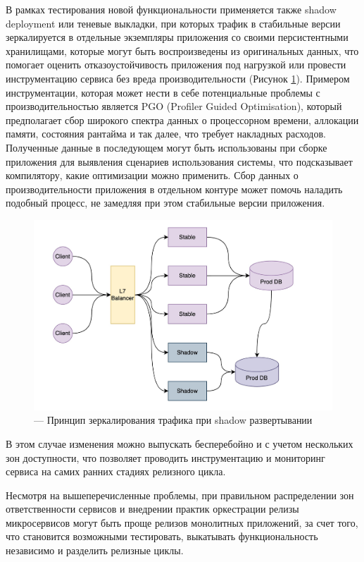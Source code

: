 В рамках тестирования новой функциональности применяется также sha\-dow deployment или теневые выкладки,
при которых трафик в стабильные версии зеркалируется в отдельные экземпляры приложения со своими персистентными хранилищами,
которые могут быть воспроизведены из оригинальных данных, что помогает оценить отказоустойчивость
приложения под нагрузкой или провести инструментацию сервиса без вреда производительности (Рисунок \ref{fig:shadow}).
Примером инструментации, которая может нести в себе потенциальные проблемы с производительностью
является PGO (Profiler Guided Optimisation), который предполагает сбор широкого спектра данных о
процессорном времени, аллокации памяти, состояния рантайма и так далее, что требует накладных расходов.
Полученные данные в последующем могут быть использованы при сборке приложения для выявления сценариев
использования системы, что подсказывает компилятору, какие оптимизации можно применить.
Сбор данных о производительности приложения в отдельном контуре может помочь наладить подобный процесс, не замедляя
при этом стабильные версии приложения.
\begin{figure}[H]
    \centering
    \includegraphics[width=0.8\linewidth]{img/shadow.jpg}
    \caption{--- Принцип зеркалирования трафика при shadow развертывании}
    \label{fig:shadow}
\end{figure}

В этом случае изменения можно выпускать бесперебойно и с учетом нескольких зон
доступности, что позволяет проводить инструментацию и мониторинг сервиса на самих ранних стадиях релизного цикла.

Несмотря на вышеперечисленные проблемы, при правильном распределении зон ответственности
сервисов и внедрении практик оркестрации 
релизы микросервисов могут быть проще релизов монолитных приложений, 
за счет того, что становится возможными тестировать, выкатывать 
функциональность независимо и разделить релизные циклы.

